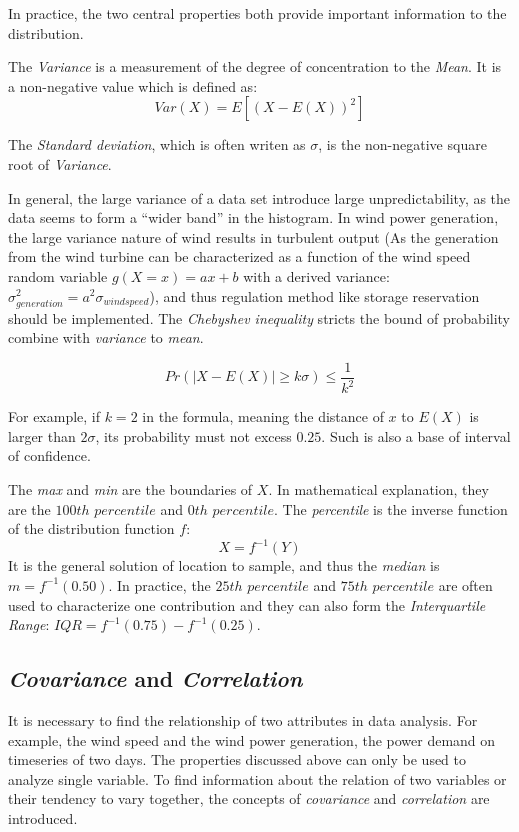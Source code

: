 \documentclass[12pt,a4paper]{report}
\begin{document}
        In practice, the two central properties both provide important information to the distribution.

        The \emph{Variance} is a measurement of the degree of concentration to the \emph{Mean}. It is a non-negative value which is defined as:
        \begin{equation}
            Var(X) = E[(X-E(X))^2]
        \end{equation}

        The \emph{Standard deviation}, which is often writen as $\sigma$, is the non-negative square root of \emph{Variance}.

        In general, the large variance of a data set introduce large unpredictability, as the data seems to form a ``wider band'' in the histogram. In wind power generation, the large variance nature of wind results in turbulent output (As the generation from the wind turbine can be characterized as a function of the wind speed random variable $g(X=x) = ax + b$ with a derived variance: $\sigma_{generation}^2 = a^2\sigma_{wind speed}$), and thus regulation method like storage reservation should be implemented.
        The \emph{Chebyshev inequality} stricts the bound of probability combine with \emph{variance} to \emph{mean}.

        \begin{equation}
            Pr(|X-E(X)| \geq k\sigma) \leq \frac{1}{k^2}
            \label{formula_chebyshev_inequality}
        \end{equation}

        For example, if $k = 2$ in the formula, meaning the distance of $x$ to $E(X)$ is larger than $2\sigma$, its probability must not excess $0.25$. Such is also a base of interval of confidence.

        The \emph{max} and \emph{min} are the boundaries of $X$. In mathematical explanation, they are the $100th \, \, percentile$ and $0th \,\, percentile$. The \emph{percentile} is the inverse function of the distribution function $f$:
        \begin{equation}
            X = f^{-1}(Y)
        \end{equation}
        It is the general solution of location to sample, and thus the \emph{median} is $m = f^{-1}(0.50)$. In practice, the $25th \,\, percentile$ and $75th \,\, percentile$ are often used to characterize one contribution and they can also form the \emph{Interquartile Range}: $IQR = f^{-1}(0.75)-f^{-1}(0.25)$.

        \subsection{\emph{Covariance} and \emph{Correlation}}
        It is necessary to find the relationship of two attributes in data analysis. For example, the wind speed and the wind power generation, the power demand on timeseries of two days. The properties discussed above can only be used to analyze single variable. To find information about the relation of two variables or their tendency to vary together, the concepts of \emph{covariance} and \emph{correlation} are introduced.
\end{document}
